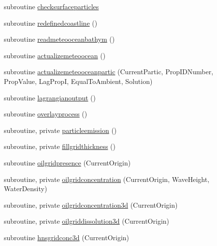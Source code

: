 \begin{DoxyCompactItemize}
\item 
subroutine \mbox{\hyperlink{namespacemodulelagrangianglobal_af1cf941e45155a5b9a97ed3fe09f5c58}{checksurfaceparticles}}
\item 
subroutine \mbox{\hyperlink{namespacemodulelagrangianglobal_a83377eb734750e27543838294b2cf44d}{redefinedcoastline}} ()
\item 
subroutine \mbox{\hyperlink{namespacemodulelagrangianglobal_a46ea20c9e2d71865f07f69618754831d}{readmeteooceanbathym}} ()
\item 
subroutine \mbox{\hyperlink{namespacemodulelagrangianglobal_a0fa07eb74ec148c5c6faeec4cd4561c9}{actualizemeteoocean}} ()
\item 
subroutine \mbox{\hyperlink{namespacemodulelagrangianglobal_ae28614950d33d82496f705c7601b8d28}{actualizemeteooceanpartic}} (Current\+Partic, Prop\+I\+D\+Number, Prop\+Value, Lag\+PropI, Equal\+To\+Ambient, Solution)
\item 
subroutine \mbox{\hyperlink{namespacemodulelagrangianglobal_a3e9da0dad79c6c6965b34c4f0d9232a0}{lagrangianoutput}} ()
\item 
subroutine \mbox{\hyperlink{namespacemodulelagrangianglobal_ac6d604733d4fe67d94733e7f0e9d8a12}{overlayprocess}} ()
\item 
subroutine, private \mbox{\hyperlink{namespacemodulelagrangianglobal_ab8435882bf5630b41c65435698454d30}{particleemission}} ()
\item 
subroutine, private \mbox{\hyperlink{namespacemodulelagrangianglobal_a36b19f9334aaf4289e0ec7ea7eea643c}{fillgridthickness}} ()
\item 
subroutine \mbox{\hyperlink{namespacemodulelagrangianglobal_aa8eb3a0829714276b28efb92746fc92f}{oilgridpresence}} (Current\+Origin)
\item 
subroutine, private \mbox{\hyperlink{namespacemodulelagrangianglobal_a062a888cb9da76f6463a22370b86c56a}{oilgridconcentration}} (Current\+Origin, Wave\+Height, Water\+Density)
\item 
subroutine, private \mbox{\hyperlink{namespacemodulelagrangianglobal_a0f83256f515b161c9b16d0c3ed51d10b}{oilgridconcentration3d}} (Current\+Origin)
\item 
subroutine, private \mbox{\hyperlink{namespacemodulelagrangianglobal_ae9aaec1deb51656e3b70875e752b480f}{oilgriddissolution3d}} (Current\+Origin)
\item 
subroutine \mbox{\hyperlink{namespacemodulelagrangianglobal_a8c236ab2fa5219dffb9444c1ed075d48}{hnsgridconc3d}} (Current\+Origin)
\item 

\end{DoxyCompactItemize}
